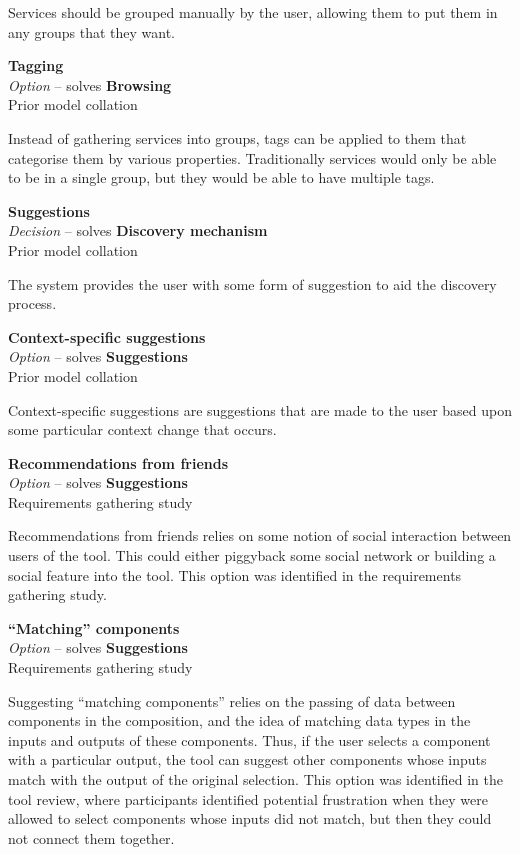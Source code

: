 Services should be grouped manually by the user, allowing them to put them in any groups that they want.

\textbf{Tagging} \\ \emph{Option} -- solves \textbf{Browsing} \\ Prior model collation \cite{Grammel2010}

Instead of gathering services into groups, tags can be applied to them that categorise them by various properties. Traditionally services would only be able to be in a single group, but they would be able to have multiple tags.

\textbf{Suggestions} \\ \emph{Decision} -- solves \textbf{Discovery mechanism} \\ Prior model collation \cite{Grammel2010}

The system provides the user with some form of suggestion to aid the discovery process.

\textbf{Context-specific suggestions} \\ \emph{Option} -- solves \textbf{Suggestions} \\ Prior model collation \cite{Grammel2010}

Context-specific suggestions are suggestions that are made to the user based upon some particular context change that occurs.

\textbf{Recommendations from friends} \\ \emph{Option} -- solves \textbf{Suggestions} \\ Requirements gathering study

Recommendations from friends relies on some notion of social interaction between users of the tool. This could either piggyback some social network or building a social feature into the tool. This option was identified in the requirements gathering study.

\textbf{``Matching'' components} \\ \emph{Option} -- solves \textbf{Suggestions} \\ Requirements gathering study

Suggesting ``matching components'' relies on the passing of data between components in the composition, and the idea of matching data types in the inputs and outputs of these components. Thus, if the user selects a component with a particular output, the tool can suggest other components whose inputs match with the output of the original selection. This option was identified in the tool review, where participants identified potential frustration when they were allowed to select components whose inputs did not match, but then they could not connect them together.

